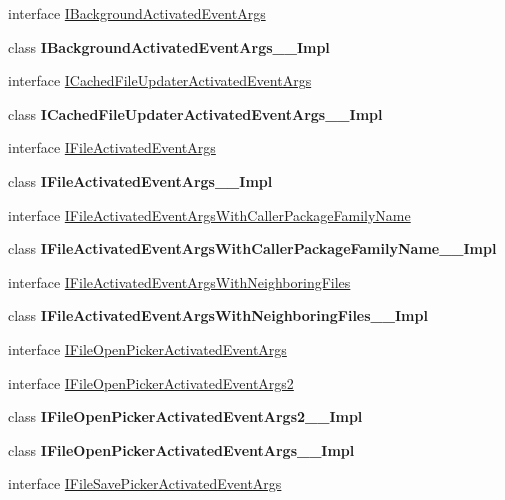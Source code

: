 \begin{DoxyCompactItemize}
\item 
interface \hyperlink{interface_windows_1_1_application_model_1_1_activation_1_1_i_background_activated_event_args}{I\+Background\+Activated\+Event\+Args}
\item 
class {\bfseries I\+Background\+Activated\+Event\+Args\+\_\+\+\_\+\+Impl}
\item 
interface \hyperlink{interface_windows_1_1_application_model_1_1_activation_1_1_i_cached_file_updater_activated_event_args}{I\+Cached\+File\+Updater\+Activated\+Event\+Args}
\item 
class {\bfseries I\+Cached\+File\+Updater\+Activated\+Event\+Args\+\_\+\+\_\+\+Impl}
\item 
interface \hyperlink{interface_windows_1_1_application_model_1_1_activation_1_1_i_file_activated_event_args}{I\+File\+Activated\+Event\+Args}
\item 
class {\bfseries I\+File\+Activated\+Event\+Args\+\_\+\+\_\+\+Impl}
\item 
interface \hyperlink{interface_windows_1_1_application_model_1_1_activation_1_1_i_file_activated_event_args_with_caller_package_family_name}{I\+File\+Activated\+Event\+Args\+With\+Caller\+Package\+Family\+Name}
\item 
class {\bfseries I\+File\+Activated\+Event\+Args\+With\+Caller\+Package\+Family\+Name\+\_\+\+\_\+\+Impl}
\item 
interface \hyperlink{interface_windows_1_1_application_model_1_1_activation_1_1_i_file_activated_event_args_with_neighboring_files}{I\+File\+Activated\+Event\+Args\+With\+Neighboring\+Files}
\item 
class {\bfseries I\+File\+Activated\+Event\+Args\+With\+Neighboring\+Files\+\_\+\+\_\+\+Impl}
\item 
interface \hyperlink{interface_windows_1_1_application_model_1_1_activation_1_1_i_file_open_picker_activated_event_args}{I\+File\+Open\+Picker\+Activated\+Event\+Args}
\item 
interface \hyperlink{interface_windows_1_1_application_model_1_1_activation_1_1_i_file_open_picker_activated_event_args2}{I\+File\+Open\+Picker\+Activated\+Event\+Args2}
\item 
class {\bfseries I\+File\+Open\+Picker\+Activated\+Event\+Args2\+\_\+\+\_\+\+Impl}
\item 
class {\bfseries I\+File\+Open\+Picker\+Activated\+Event\+Args\+\_\+\+\_\+\+Impl}
\item 
interface \hyperlink{interface_windows_1_1_application_model_1_1_activation_1_1_i_file_save_picker_activated_event_args}{I\+File\+Save\+Picker\+Activated\+Event\+Args}

\end{DoxyCompactItemize}
